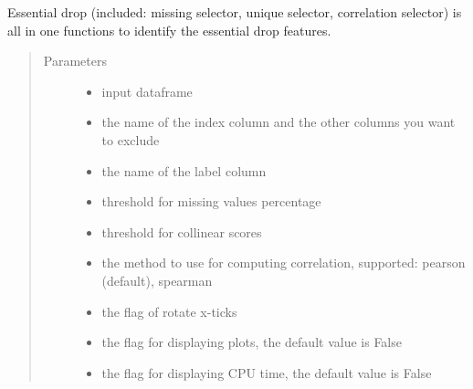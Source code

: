 \documentclass[letterpaper,11pt,english]{sphinxmanual}
\begin{document}
\begin{fulllineitems}
\begin{fulllineitems}
\label{\detokenize{auto_feature:AutoFeatures.AutoFeatures.essential_drop}}
Essential drop (included: missing selector, unique selector, correlation selector) is all in one functions
to identify the essential drop features.
\begin{quote}\begin{description}
\item[{Parameters}] \leavevmode\begin{itemize}
\item {} 
 \textendash{} input dataframe

\item {} 
 \textendash{} the name of the index column and the other columns you want to exclude

\item {} 
 \textendash{} the name of the label column

\item {} 
 \textendash{} threshold for missing values percentage

\item {} 
 \textendash{} threshold for collinear scores

\item {} 
 \textendash{} the method to use for computing correlation, supported: pearson (default), spearman

\item {} 
 \textendash{} the flag of rotate x-ticks

\item {} 
 \textendash{} the flag for displaying plots, the default value is False

\item {} 
 \textendash{} the flag for displaying CPU time, the default value is False


\end{itemize}
\end{description}
\end{quote}
\end{fulllineitems}
\end{fulllineitems}
\end{document}
